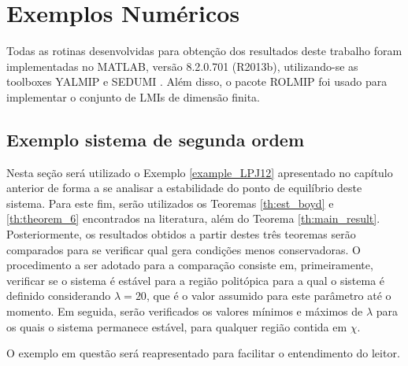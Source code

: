 \section{Exemplos Numéricos}

Todas as rotinas desenvolvidas para obtenção dos resultados deste trabalho foram implementadas no MATLAB, versão  8.2.0.701 (R2013b), utilizando-se as toolboxes YALMIP \cite{Lofberg2004} e SEDUMI \cite{sedumi:2002}. Além disso, o pacote ROLMIP \cite{inproc:ROLMIP:2016} foi usado para implementar o conjunto de LMIs de dimensão finita.

\subsection{Exemplo sistema de segunda ordem}\label{sec:ex2_JPJ12_again}

Nesta seção será utilizado o Exemplo \ref{example_LPJ12} apresentado no capítulo anterior de forma a se analisar a estabilidade do ponto de equilíbrio deste sistema. Para este fim, serão utilizados os Teoremas \ref{th:est_boyd} e \ref{th:theorem_6} encontrados na literatura, além do Teorema \ref{th:main_result}. Posteriormente, os resultados obtidos a partir destes três teoremas serão comparados para se verificar qual gera condições menos conservadoras. O procedimento a ser adotado para a comparação consiste em, primeiramente, verificar se o sistema é estável para a região politópica para a qual o sistema é definido considerando $\lambda = 20$, que é o valor assumido para este parâmetro até o momento. Em seguida, serão verificados os valores mínimos e máximos de $\lambda$ para os quais o sistema permanece estável, para qualquer região contida em $\chi$.

 O exemplo em questão será reapresentado para facilitar o entendimento do leitor.

